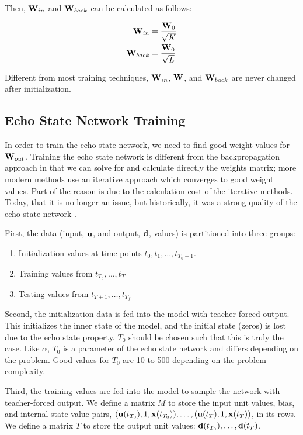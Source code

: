 \documentclass{article}
\begin{document}
Then, $\mathbf{W}_{in}$ and $\mathbf{W}_{back}$ can be calculated as follows:

\begin{align}
    \mathbf{W}_{in} &= \frac{\mathbf{W}_0}{\sqrt{K}} \nonumber \\
    \mathbf{W}_{back} &= \frac{\mathbf{W}_0}{\sqrt{L}} \nonumber
\end{align}

Different from most training techniques, $\mathbf{W}_{in}$, $\mathbf{W}$, and $\mathbf{W}_{back}$ are never
changed after initialization.

\subsection{Echo State Network Training}
\label{sec:etrain}

In order to train the echo state network, we need to find good weight values
for $\mathbf{W}_{out}$. Training the echo state network is different from the
backpropagation approach in that we can solve for and calculate directly the
weights matrix; more modern methods use an iterative approach which converges
to good weight values. Part of the reason is due to the calculation cost of
the iterative methods. Today, that it is no longer an issue, but
historically, it was a strong quality of the echo state network
\cite{jaeger2007echo}.

First, the data (input, $\mathbf{u}$, and output, $\mathbf{d}$, values) is partitioned into
three groups:
\begin{enumerate}
    \item Initialization values at time points
    $t_0, t_1, \dots, t_{T_0-1}$.
    \item Training values from
    $t_{T_0}, \dots, t_T$
    \item Testing values from
    $t_{T+1}, \dots, t_{T_f}$
\end{enumerate}

Second, the initialization data is fed into the model with teacher-forced 
output. This initializes the
inner state of the model, and the initial state (zeros) is lost due to the
echo state property. $T_0$ should be chosen such that this is truly the case.
Like $\alpha$, $T_0$ is a parameter of the echo state network and differs
depending on the problem. Good values for $T_0$ are 10 to 500 depending on
the problem complexity.

Third, the training values are fed into the model to sample the network with 
teacher-forced output. We define a matrix $M$ to store the input unit values,
bias, and internal state value pairs, $(\mathbf{u}(t_{T_0}), 1, \mathbf{x}(t_{T_0})), \dots,
(\mathbf{u}(t_T), 1, \mathbf{x}(t_T))$, in its rows. We define a matrix $T$ to store the 
output unit values: $\mathbf{d}(t_{T_0}), \dots, \mathbf{d}(t_T)$.
\end{document}
